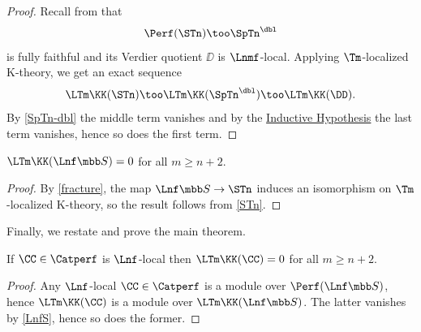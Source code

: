\begin{proof}
	Recall from \cite[Proposition 4.15]{DescVan} that
	\[
		\Perf(\STn) \too \SpTn^\dbl
	\]
	is fully faithful and its Verdier quotient $\DD$ is $\Lnmf$-local.
	Applying $\Tm$-localized K-theory, we get an exact sequence
	\[
		\LTm \KK(\STn) \too \LTm \KK(\SpTn^\dbl) \too \LTm \KK(\DD).
	\]
	By \cref{SpTn-dbl} the middle term vanishes and by the \hyperref[inductive-assumption]{Inductive Hypothesis} the last term vanishes, hence so does the first term.
\end{proof}

\begin{prop}\label{LnfS}
	$\LTm \KK(\Lnf\SS) = 0$ for all $m \geq n{+}2$.
\end{prop}

\begin{proof}
	By \cref{fracture}, the map $\Lnf\SS \to \STn$ induces an isomorphism on $\Tm$-localized K-theory, so the result follows from \cref{STn}.
\end{proof}

Finally, we restate and prove the main theorem.

\begin{thm}\label{main-thm}
	If $\CC \in \Catperf$ is $\Lnf$-local then $\LTm \KK(\CC) = 0$ for all $m \geq n{+}2$.
\end{thm}

\begin{proof}
	Any $\Lnf$-local $\CC \in \Catperf$ is a module over $\Perf(\Lnf\SS)$, hence $\LTm \KK(\CC)$ is a module over $\LTm \KK(\Lnf\SS)$.
	The latter vanishes by \cref{LnfS}, hence so does the former.
\end{proof}
